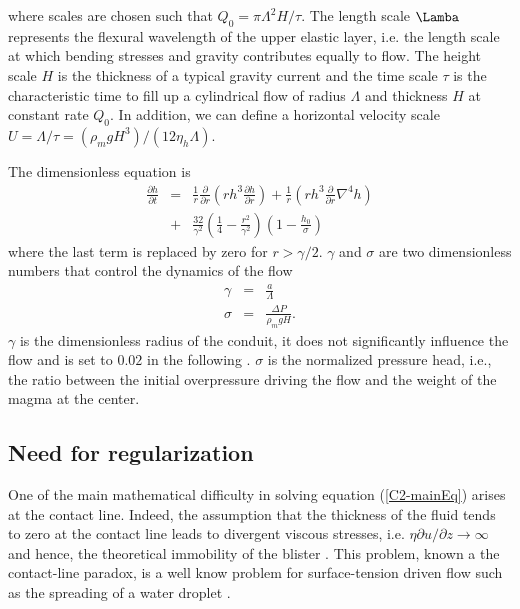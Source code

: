 where scales  are chosen  such that $Q_0  = \pi\Lambda^2  H/\tau$. The
length scale $\Lamba$ represents the  flexural wavelength of the upper
elastic layer,  i.e. the  length scale at  which bending  stresses and
gravity  contributes equally  to flow.   The height  scale $H$  is the
thickness of  a typical gravity current  and the time scale  $\tau$ is
the  characteristic time  to  fill  up a  cylindrical  flow of  radius
$\Lambda$ and thickness  $H$ at constant rate $Q_0$.   In addition, we
can       define        a       horizontal        velocity       scale
$U=\Lambda/\tau=\left(\rho_m           g           H^3\right)/\left(12
  \eta_h\Lambda\right)$.

The dimensionless equation is
\begin{eqnarray}
  \frac{\partial h}{\partial t}& =&\frac{1}{ r}
                                    \frac{\partial}{\partial r}  \left( rh^3  \frac{\partial h}{\partial
                                    r}\right)+\frac{1}{ r} \left( rh^3
                                    \frac{\partial}{\partial
                                    r}\nabla^4h\right)\nonumber\\
                               &+&
                                   \frac{32}{\gamma^{2}}\left(\frac{1}{4}-\frac{r^{2}}{\gamma^{2}}\right)\left(1-\frac{h_0}{\sigma}\right)
                                   \label{C2-mainEq}
\end{eqnarray}
where the last term is replaced by zero for $r>\gamma/2$. $\gamma$ and
$\sigma$ are  two dimensionless numbers  that control the  dynamics of
the flow
\begin{eqnarray}
  \gamma &=& \frac{a}{\Lambda}\\
  \sigma &=& \frac{\Delta P}{\rho_m g H}.
\end{eqnarray}
$\gamma$  is the  dimensionless radius  of  the conduit,  it does  not
significantly influence the flow and is set to $0.02$ in the following
\citep{Michaut:2009jx,Michaut:2011kg}.   $\sigma$  is  the  normalized
pressure  head,  i.e.,  the  ratio between  the  initial  overpressure
driving the flow and the weight of the magma at the center.
	 
\subsection{Need for regularization}
\label{C2-sec:need-regularization}

One  of   the  main   mathematical  difficulty  in   solving  equation
(\ref{C2-mainEq}) arises at the  contact line.  Indeed, the assumption
that the  thickness of  the fluid  tends to zero  at the  contact line
leads       to       divergent      viscous       stresses,       i.e.
$\eta  \partial   u/\partial  z\rightarrow  \infty$  and   hence,  the
theoretical         immobility          of         the         blister
\citep{Flitton:1999iv,Lister:2013ia,Anonymous:QWXp_4JV}. This problem,
known  a  the  contact-line  paradox,  is  a  well  know  problem  for
surface-tension driven flow  such as the spreading of  a water droplet
\citep{Bertozzi:1998wz,Snoeijer:2013cm}.

